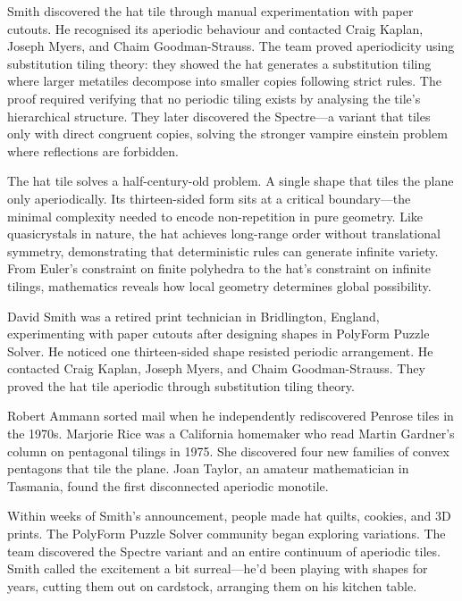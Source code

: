 Smith discovered the hat tile through manual experimentation with paper cutouts. He recognised its aperiodic behaviour and contacted Craig Kaplan, Joseph Myers, and Chaim Goodman-Strauss. The team proved aperiodicity using substitution tiling theory: they showed the hat generates a substitution tiling where larger \QSOpen{}metatiles\QSClose{} decompose into smaller copies following strict rules. The proof required verifying that no periodic tiling exists by analysing the tile's hierarchical structure. They later discovered the \QSOpen{}Spectre\QSClose{}—a variant that tiles only with direct congruent copies, solving the stronger \QSOpen{}vampire einstein\QSClose{} problem where reflections are forbidden.

The hat tile solves a half-century-old problem. A single shape that tiles the plane only aperiodically. Its thirteen-sided form sits at a critical boundary—the minimal complexity needed to encode non-repetition in pure geometry. Like quasicrystals in nature, the hat achieves long-range order without translational symmetry, demonstrating that deterministic rules can generate infinite variety. From Euler's constraint on finite polyhedra to the hat's constraint on infinite tilings, mathematics reveals how local geometry determines global possibility.

\begin{commentary}
David Smith was a retired print technician in Bridlington, England, experimenting with paper cutouts after designing shapes in PolyForm Puzzle Solver. He noticed one thirteen-sided shape resisted periodic arrangement. He contacted Craig Kaplan, Joseph Myers, and Chaim Goodman-Strauss. They proved the hat tile aperiodic through substitution tiling theory.

Robert Ammann sorted mail when he independently rediscovered Penrose tiles in the 1970s. Marjorie Rice was a California homemaker who read Martin Gardner's column on pentagonal tilings in 1975. She discovered four new families of convex pentagons that tile the plane. Joan Taylor, an amateur mathematician in Tasmania, found the first disconnected aperiodic monotile.

Within weeks of Smith's announcement, people made hat quilts, cookies, and 3D prints. The PolyForm Puzzle Solver community began exploring variations. The team discovered the Spectre variant and an entire continuum of aperiodic tiles. Smith called the excitement \QSOpen{}a bit surreal\QSClose{}—he'd been playing with shapes for years, cutting them out on cardstock, arranging them on his kitchen table. 

\end{commentary}


